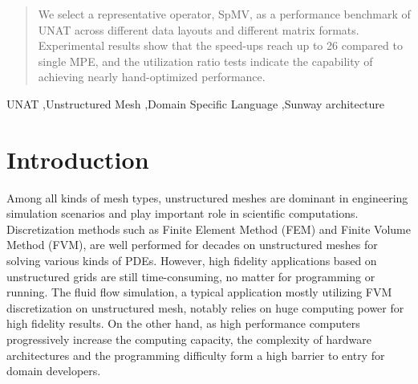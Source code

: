 \documentclass[5p,times]{elsarticle}
\begin{document}
\begin{frontmatter}
\begin{abstract}
We select a representative operator, SpMV, as a performance benchmark of UNAT across different data layouts and different matrix formats. Experimental results show that the speed-ups reach up to 26 compared to single MPE, and the utilization ratio tests indicate the capability of achieving nearly hand-optimized performance.
\end{abstract}



\begin{keyword}
UNAT \sep Unstructured Mesh \sep Domain Specific Language \sep Sunway architecture


\end{keyword}

\end{frontmatter}


\section{Introduction}
\label{Introduction}

Among all kinds of mesh types, unstructured meshes are dominant in engineering simulation scenarios and play important role in scientific computations. Discretization methods such as Finite Element Method (FEM) and Finite Volume Method (FVM), are well performed for decades on unstructured meshes for solving various kinds of PDEs. However, high fidelity applications based on unstructured grids are still time-consuming, no matter for programming or running. The fluid flow simulation, a typical application mostly utilizing FVM discretization on unstructured mesh, notably relies on huge computing power for high fidelity results. On the other hand, as high performance computers progressively increase the computing capacity, the complexity of hardware architectures and the programming difficulty form a high barrier to entry for domain developers.
\end{document}

